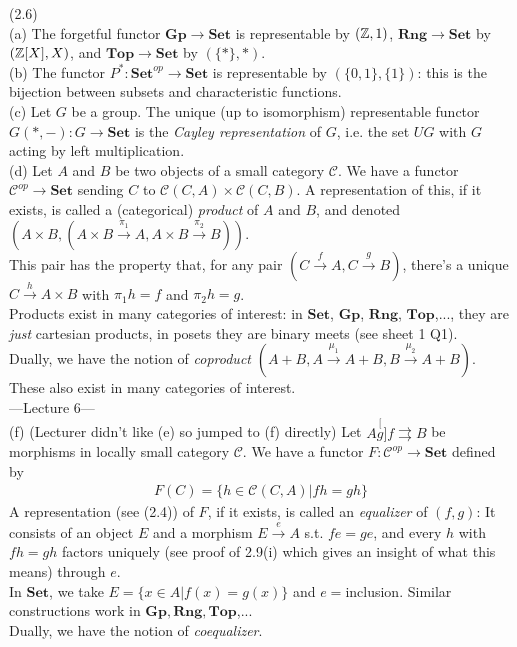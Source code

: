 \documentclass[a4paper]{article}
\begin{document}
\begin{eg} (2.6)\\
    (a) The forgetful functor $\mathbf{Gp} \to \mathbf{Set}$ is representable by $(\mathbb{Z},1)$, $\mathbf{Rng} \to \mathbf{Set}$ by $(\mathbb{Z}[X],X)$, and $\mathbf{Top} \to \mathbf{Set}$ by $(\{*\},*)$.\\
    (b) The functor $P^*: \mathbf{Set}^{op} \to \mathbf{Set}$ is representable by $(\{0,1\},\{1\})$: this is the bijection between subsets and characteristic functions.\\
    (c) Let $G$ be a group. The unique (up to isomorphism) representable functor $G(*,-): G \to \mathbf{Set}$ is the \emph{Cayley representation} of $G$, i.e. the set $UG$ with $G$ acting by left multiplication.\\
    (d) Let $A$ and $B$ be two objects of a small category $\mathcal{C}$. We have a functor $\mathcal{C}^{op} \to \mathbf{Set}$ sending $C$ to $\mathcal{C}(C,A) \times \mathcal{C}(C,B)$. A representation of this, if it exists, is called a (categorical) \emph{product} of $A$ and $B$, and denoted $(A \times B,(A \times B \xrightarrow{\pi_1} A, A \times B \xrightarrow{\pi_2} B))$.\\
    This pair has the property that, for any pair $(C \xrightarrow{f}A,C\xrightarrow{g}B)$, there's a unique $C \xrightarrow{h} A \times B$ with $\pi_1 h = f$ and $\pi_2 h = g$.\\
    Products exist in many categories of interest: in $\mathbf{Set}$, $\mathbf{Gp}$, $\mathbf{Rng}$, $\mathbf{Top}$,..., they are \emph{just} cartesian products, in posets they are binary meets (see sheet 1 Q1).\\
    Dually, we have the notion of \emph{coproduct} $(A+B,A \xrightarrow{\mu_1} A + B, B \xrightarrow{\mu_2}A+B)$.\\
    These also exist in many categories of interest.\\
    ---Lecture 6---\\
    (f) (Lecturer didn't like (e) so jumped to (f) directly) Let $A \stackrel[g]{f}{\rightrightarrows} B$ be morphisms in locally small category $\mathcal{C}$. We have a functor $F:\mathcal{C}^{op} \to \mathbf{Set}$ defined by 
    \begin{equation*}
        \begin{aligned}
            F(C) = \{h \in \mathcal{C}(C,A) | fh = gh\}
        \end{aligned}
    \end{equation*}
    A representation (see (2.4)) of $F$, if it exists, is called an \emph{equalizer} of $(f,g)$: It consists of an object $E$ and a morphism $E \xrightarrow{e} A$ s.t. $fe=ge$, and every $h$ with $fh=gh$ factors uniquely (see proof of 2.9(i) which gives an insight of what this means) through $e$.\\
    In $\mathbf{Set}$, we take $E = \{x \in A | f(x) = g(x) \}$ and $e=$inclusion. Similar constructions work in $\mathbf{Gp},\mathbf{Rng},\mathbf{Top}$,...\\
    Dually, we have the notion of \emph{coequalizer}.
\end{eg}
\end{document}
